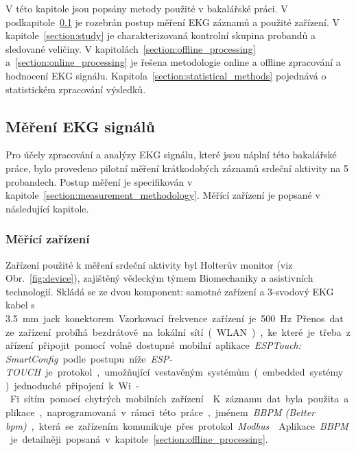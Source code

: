 V této kapitole jsou popsány metody použité v bakalářské práci. V
podkapitole~\ref{section:measurement} je rozebrán postup měření EKG záznamů a
použité zařízení. V kapitole~\ref{section:study} je charakterizovaná kontrolní
skupina probandů a sledované veličiny. V
kapitolách~\ref{section:offline_processing} a~\ref{section:online_processing} je
řešena metodologie online a offline zpracování a hodnocení EKG signálu.
Kapitola~\ref{section:statistical_methods} pojednává o statistickém zpracování
výsledků.

\subsection{Měření EKG signálů}
\label{section:measurement}
Pro účely zpracování a analýzy EKG signálu, které jsou náplní této bakalářské
práce, bylo provedeno pilotní měření krátkodobých záznamů srdeční aktivity na 5
probandech. Postup měření je specifikován v
kapitole~\ref{section:measurement_methodology}. Měřící zařízení je popsané v
následující kapitole.

\subsubsection{Měřící zařízení}
\label{section:measurement_device}
Zařízení použité k měření srdeční aktivity byl Holterův monitor (viz
Obr.~\ref{fig:device}), zajištěný vědeckým týmem Biomechaniky a asistivních
technologií. Skládá se ze dvou komponent: samotné zařízení a 3-svodový EKG kabel
s 3.5~\si\mm~jack konektorem. Vzorkovací frekvence zařízení je 500~\si\Hz.

Přenos dat ze zařízení probíhá bezdrátově na lokální sítí (WLAN), ke které je
třeba zařízení připojit pomocí volně dostupné mobilní aplikace \textit{ESPTouch:
SmartConfig} podle postupu níže. \textit{ESP-TOUCH} je protokol, umožňující
vestavěným systémům (embedded systémy) jednoduché připojení k Wi-Fi sítím pomocí
chytrých mobilních zařízení~\cite{esptouch}. K záznamu dat byla použita
aplikace, naprogramovaná v rámci této práce, jménem \textit{BBPM (Better bpm)},
která se zařízením komunikuje přes protokol \textit{Modbus}~\cite{modbus}.
Aplikace \textit{BBPM} je detailněji popsaná v
kapitole~\ref{section:offline_processing}.

